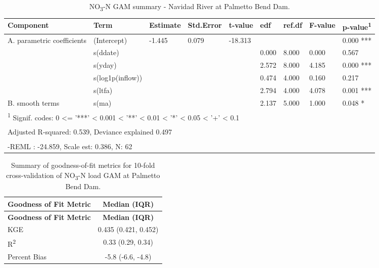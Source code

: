 \documentclass[
]{article}
\newenvironment{widestuff}{\begin{table}[h]\begin{adjustwidth}{-4.5cm}{-4.5cm}\centering}{\end{adjustwidth}\end{table}}
\begin{document}
\begin{widestuff}

\caption{NO\textsubscript{3}-N GAM summary - Navidad River at Palmetto Bend Dam.}
\centering
\begin{tabular}[t]{lllllllll}
\toprule
Component & Term & Estimate & Std.Error & t-value & edf & ref.df & F-value & p-value\textsuperscript{1}\\
\midrule
A. parametric coefficients & (Intercept) & -1.445 & 0.079 & -18.313 &  &  &  & 0.000 ***\\
\cmidrule{1-9}
 & s(ddate) &  &  &  & 0.000 & 8.000 & 0.000 & 0.567\\

 & s(yday) &  &  &  & 2.572 & 8.000 & 4.185 & 0.000 ***\\

 & s(log1p(inflow)) &  &  &  & 0.474 & 4.000 & 0.160 & 0.217\\

 & s(ltfa) &  &  &  & 2.794 & 4.000 & 4.078 & 0.001 ***\\

\multirow[t]{-5}{*}{\raggedright\arraybackslash B. smooth terms} & s(ma) &  &  &  & 2.137 & 5.000 & 1.000 & 0.048 *\\
\bottomrule
\multicolumn{9}{l}{\textsuperscript{1} Signif. codes: 0 <= '***' < 0.001 < '**' < 0.01 < '*' < 0.05 < '+' < 0.1}\\
\multicolumn{9}{l}{\textsuperscript{} Adjusted R-squared: 0.539, Deviance explained 0.497}\\
\multicolumn{9}{l}{\textsuperscript{} -REML : -24.859, Scale est: 0.386, N: 62}\\
\end{tabular}
\end{widestuff}

\hypertarget{tbl-NO3PalmettoBend-CV}{}
\begin{longtable}[]{@{}lc@{}}
\caption{\label{tbl-NO3PalmettoBend-CV}Summary of goodness-of-fit
metrics for 10-fold cross-validation of NO\textsubscript{3}-N load GAM
at Palmetto Bend Dam.}\tabularnewline
\toprule()
\textbf{Goodness of Fit Metric} & \textbf{Median (IQR)} \\
\midrule()
\endfirsthead
\toprule()
\textbf{Goodness of Fit Metric} & \textbf{Median (IQR)} \\
\midrule()
\endhead
KGE & 0.435 (0.421, 0.452) \\
R\textsuperscript{2} & 0.33 (0.29, 0.34) \\
Percent Bias & -5.8 (-6.6, -4.8) \\
\bottomrule()
\end{longtable}
\end{document}
